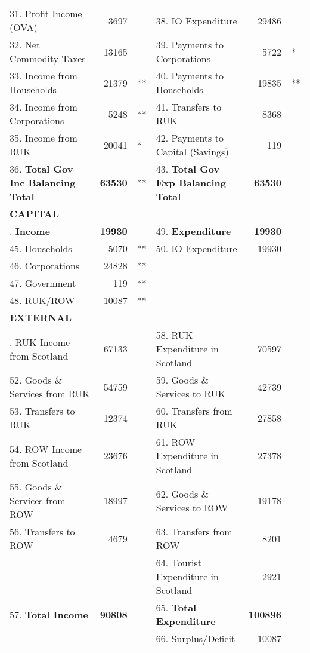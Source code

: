 \begin{table}[H]
\begin{scriptsize}
\begin{centering}
\begin{spacing}{1.2}
\begin{tabular}{lrllrl}
       31. Profit Income (OVA) & 3697 & & 38. IO Expenditure & 29486 & \\
       32. Net Commodity Taxes & 13165 & & 39. Payments to Corporations & 5722 &* \\
       33. Income from Households & 21379 &** & 40. Payments to Households & 19835 &** \\
       34. Income from Corporations & 5248 &** & 41. Transfers to RUK & 8368 & \\
       35. Income from RUK & 20041 &* & 42. Payments to Capital (Savings) & 119 & \\
       36. \textbf{Total Gov Inc Balancing Total} & \textbf{63530} &** & 43. \textbf{Total Gov Exp Balancing Total} & \textbf{63530} &  \\
    \hline
    \textbf{CAPITAL} \bigstrut\\
    \hline
\bigstrut[t]       44. \textbf{Income} & \textbf{19930}  &   & 49. \textbf{Expenditure} & \textbf{19930} & \\
       45. Households & 5070 &** & 50. IO Expenditure & 19930 &  \\
       46. Corporations & 24828 &** &  \\
       47. Government & 119 &** &  \\
       48. RUK/ROW & -10087 &** &  \\
    \hline
    \textbf{EXTERNAL} \bigstrut\\
    \hline
\bigstrut[t]  51. RUK Income from Scotland & 67133  &   & 58. RUK Expenditure in Scotland & 70597 & \\
       52. Goods \& Services from RUK & 54759 & & 59. Goods \& Services to RUK & 42739 & \\
       53. Transfers to RUK & 12374 & & 60. Transfers from RUK & 27858 & \\
       54. ROW Income from Scotland & 23676 & & 61. ROW Expenditure in Scotland & 27378 & \\
       55. Goods \& Services from ROW & 18997 & & 62. Goods \& Services to ROW & 19178 & \\
       56. Transfers to ROW & 4679 & & 63. Transfers from ROW & 8201 & \\
       & & & 64. Tourist Expenditure in Scotland & 2921 & \\
       57. \textbf{Total Income} & \textbf{90808} & & 65. \textbf{Total Expenditure} & \textbf{100896} &  \\  
        & & & 66. Surplus/Deficit &-10087 & \\  
    \hline

\end{tabular}
\end{spacing}
\end{centering}
\end{scriptsize}
\end{table}
